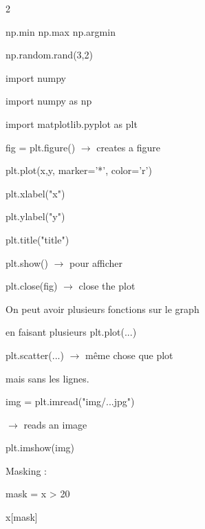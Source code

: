 \documentclass[a4paper,10pt]{article}
\begin{document}
\begin{multicols}{2}
\begin{tcolorbox}[title=NumPy]
np.min \quad np.max \quad np.argmin

np.random.rand(3,2)
\end{tcolorbox}

\columnbreak

\begin{tcolorbox}[title=Matplotlib]
import numpy

import numpy as np

import matplotlib.pyplot as plt

\vspace{2mm}

fig = plt.figure() $\rightarrow$ creates a figure

\vspace{2mm}

plt.plot(x,y, marker='*', color='r')

plt.xlabel("x")

plt.ylabel("y")

plt.title("title")

plt.show() $\rightarrow$ pour afficher

plt.close(fig) $\rightarrow$ close the plot

\vspace{2mm}

On peut avoir plusieurs fonctions sur le graph

en faisant plusieurs plt.plot(...)

\vspace{2mm}

plt.scatter(...) $\rightarrow$ même chose que plot

mais sans les lignes.

\vspace{2mm}

img = plt.imread("img/...jpg")

$\rightarrow$ reads an image

plt.imshow(img)

\vspace{2mm}

Masking :

mask = x > 20

x[mask]
\end{tcolorbox}

\end{multicols}
\end{document}
